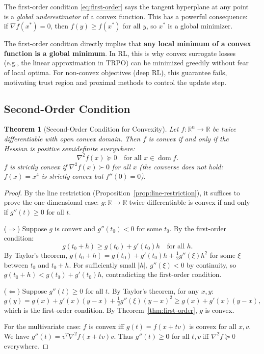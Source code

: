 \documentclass[11pt,a4paper]{article}
\newtheorem{theorem}{Theorem}[section]
\theoremstyle{definition}
\theoremstyle{remark}
\newcommand{\R}{\mathbb{R}}
\DeclareMathOperator{\dom}{dom}
\begin{document}
\begin{keyresult}
The first-order condition \eqref{eq:first-order} says the tangent hyperplane at any point
is a \emph{global underestimator} of a convex function. This has a powerful consequence:
if $\nabla f(x^*) = 0$, then $f(y) \ge f(x^*)$ for all $y$, so $x^*$ is a global
minimizer.
\end{keyresult}

\begin{rlconnection}
The first-order condition directly implies that \textbf{any local minimum of a convex
function is a global minimum}. In RL, this is why convex surrogate losses (e.g., the
linear approximation in TRPO) can be minimized greedily without fear of local optima.
For non-convex objectives (deep RL), this guarantee fails, motivating trust region and
proximal methods to control the update step.
\end{rlconnection}

\subsection{Second-Order Condition}

\begin{theorem}[Second-Order Condition for Convexity]
\label{thm:second-order}
Let $f : \R^n \to \R$ be twice differentiable with open convex domain. Then $f$ is convex
if and only if the Hessian is positive semidefinite everywhere:
\[
  \nabla^2 f(x) \succeq 0 \quad \text{for all } x \in \dom f.
\]
$f$ is strictly convex if $\nabla^2 f(x) \succ 0$ for all $x$ (the converse does not
hold: $f(x) = x^4$ is strictly convex but $f''(0) = 0$).
\end{theorem}

\begin{proof}
By the line restriction (Proposition~\ref{prop:line-restriction}), it suffices to prove
the one-dimensional case: $g : \R \to \R$ twice differentiable is convex if and only if
$g''(t) \ge 0$ for all $t$.

($\Rightarrow$) Suppose $g$ is convex and $g''(t_0) < 0$ for some $t_0$. By the
first-order condition:
\[
  g(t_0 + h) \ge g(t_0) + g'(t_0) h \quad \text{for all } h.
\]
By Taylor's theorem, $g(t_0 + h) = g(t_0) + g'(t_0) h + \tfrac{1}{2} g''(\xi) h^2$ for
some $\xi$ between $t_0$ and $t_0 + h$. For sufficiently small $|h|$, $g''(\xi) < 0$ by
continuity, so $g(t_0 + h) < g(t_0) + g'(t_0) h$, contradicting the first-order
condition.

($\Leftarrow$) Suppose $g''(t) \ge 0$ for all $t$. By Taylor's theorem, for any $x, y$:
\[
  g(y) = g(x) + g'(x)(y - x) + \tfrac{1}{2} g''(\xi)(y - x)^2
  \ge g(x) + g'(x)(y - x),
\]
which is the first-order condition. By Theorem~\ref{thm:first-order}, $g$ is convex.

For the multivariate case: $f$ is convex iff $g(t) = f(x + tv)$ is convex for all $x, v$.
We have $g''(t) = v^T \nabla^2 f(x + tv) v$. Thus $g''(t) \ge 0$ for all $t, v$ iff
$\nabla^2 f \succeq 0$ everywhere.
\end{proof}
\end{document}
